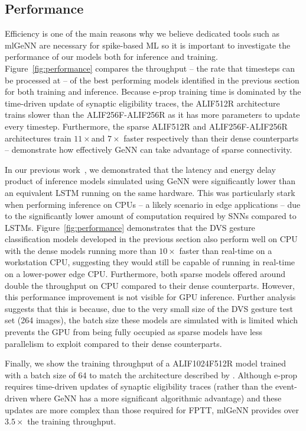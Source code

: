 \documentclass[sigconf]{acmart}
\begin{document}
\subsection{Performance}
Efficiency is one of the main reasons why we believe dedicated tools such as mlGeNN are necessary for spike-based ML so it is important to investigate the performance of our models both for inference and training.
Figure~\ref{fig:performance} compares the throughput -- the rate that timesteps can be processed at -- of the best performing models identified in the previous section for both training and inference.
Because e-prop training time is dominated by the time-driven update of synaptic eligibility traces, the ALIF512R architecture trains slower than the ALIF256F-ALIF256R as it has more parameters to update every timestep.
Furthermore, the sparse ALIF512R and ALIF256F-ALIF256R architectures train $11\times$and $7\times$ faster respectively than their dense counterparts -- demonstrate how effectively GeNN can take advantage of sparse connectivity.

In our previous work~\citep{Knight2022}, we demonstrated that the latency and energy delay product of inference models simulated using GeNN were significantly lower than an equivalent LSTM running on the same hardware.
This was particularly stark when performing inference on CPUs -- a likely scenario in edge applications -- due to the significantly lower amount of computation required by SNNs compared to LSTMs.
Figure~\ref{fig:performance} demonstrates that the DVS gesture classification models developed in the previous section also perform well on CPU with the dense models running more than $10\times$ faster than real-time on a workstation CPU, suggesting they would still be capable of running in real-time on a lower-power edge CPU.
Furthermore, both sparse models offered around double the throughput on CPU compared to their dense counterparts.
However, this performance improvement is not visible for GPU inference.
Further analysis suggests that this is because, due to the very small size of the DVS gesture test set (\num{264} images), the batch size these models are simulated with is limited which prevents the GPU from being fully occupied as sparse models have less parallelism to exploit compared to their dense counterparts. 

Finally, we show the training throughput of a ALIF1024F512R model trained with a batch size of \num{64} to match the architecture described by \citet{yin2021accurate}.
Although e-prop requires time-driven updates of synaptic eligibility traces (rather than the event-driven where GeNN has a more significant algorithmic advantage) and these updates are more complex than those required for FPTT, mlGeNN provides over $3.5\times$ the training throughput.
\end{document}
